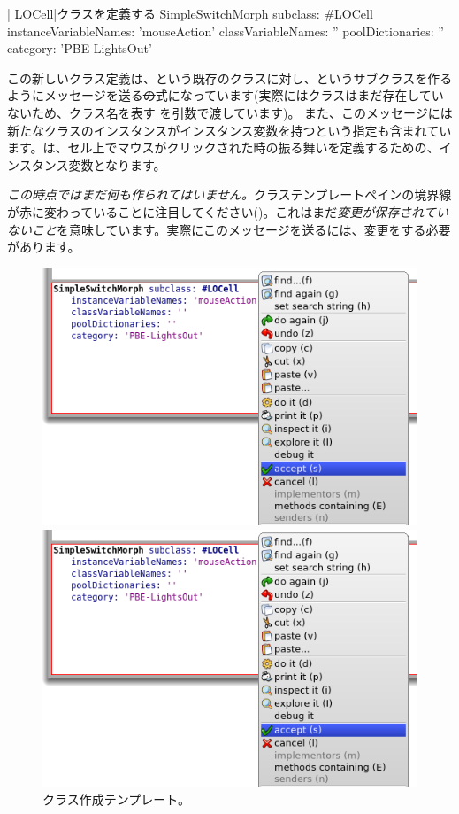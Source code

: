 \documentclass[a4paper,10pt,twoside]{book}
\begin{document}
\begin{classdef}[firstClassDef]{\ct| LOCell|クラスを定義する}
SimpleSwitchMorph subclass: #LOCell
   instanceVariableNames: 'mouseAction'
   classVariableNames: ''
   poolDictionaries: ''
   category: 'PBE-LightsOut'
\end{classdef}

この新しいクラス定義は、という既存のクラスに対し、というサブクラスを作るようにメッセージを送る\st の式になっています(実際にはクラスはまだ存在していないため、クラス名を表す を引数で渡しています)。
また、このメッセージには新たなクラスのインスタンスがインスタンス変数を持つという指定も含まれています。は、セル上でマウスがクリックされた時の振る舞いを定義するための、インスタンス変数となります。

\emph{この時点ではまだ何も作られてはいません。}クラステンプレートペインの境界線が赤に変わっていることに注目してください()。これはまだ\emph{変更が保存されていないこと}を意味しています。実際にこのメッセージを送るには、変更をする必要があります。

\begin{figure}[h!t]
\ifluluelse
	{\centerline {\includegraphics[width=\textwidth]{AcceptClassDef}}}
	{\centerline {\includegraphics[scale=0.7]{AcceptClassDef}}}
\caption{クラス作成テンプレート。
}
\end{figure}
\end{document}
